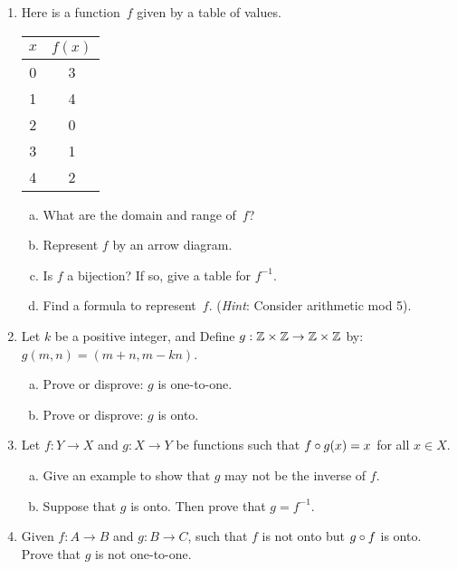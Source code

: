 \begin{enumerate}

\item
Here is a function~$f$ given by a table of values.

\begin{center}
\begin{tabular}{c|c}
$x$ & $f(x)$ \\ \hline

0 & 3 \\
1 & 4 \\
2 & 0 \\
3 & 1 \\
4 & 2 \\
\end{tabular}
\end{center}

\begin{enumerate}[(a)]
\item  \label{FunctionByTableEx-domain}
What are the domain and range  of~$f$?
\item  \label{FunctionByTableEx-pairs}
Represent $f$ by an arrow diagram.
\item
Is $f$ a bijection? If so, give a table for $f^{-1}$.
\item  \label{FunctionByTableEx-formula}
Find a formula to represent~$f$. (\emph{Hint}:  Consider arithmetic mod 5).
\end{enumerate}

\item
Let $k$ be a positive integer, and Define $g : \mathbb{Z} \times \mathbb{Z}  \rightarrow \mathbb{Z} \times \mathbb{Z}$ by: $g(m, n) = (m + n,  m - kn)$.
\begin{enumerate}[(a)]
\item
Prove or disprove:  $g$ is one-to-one.
\item
Prove or disprove:  $g$ is onto.
\end{enumerate}

\item
Let $ f:Y \rightarrow X$ and $g:X \rightarrow Y$ be functions   such that  $f \circ g(x) = x$ for all $x \in X$.
\begin{enumerate}[(a)]
\item
Give an example to show that $g$ may not be the inverse of $f$.
\item
Suppose that $g$ is onto. Then prove that $g = f^{-1}$.
\end{enumerate}

\item
Given $f : A \rightarrow B$ and $g : B \rightarrow C$, such that $f$  is not onto but  $g \circ f$  is onto. Prove that $g$ is not one-to-one.


\end{enumerate}

